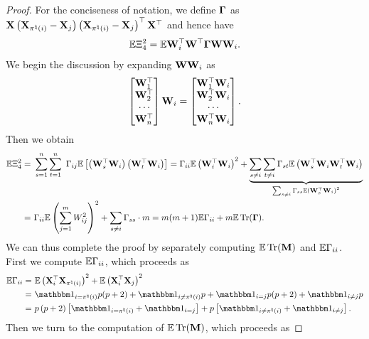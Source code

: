 \documentclass[11pt]{article}
\begin{document}
\begin{proof}
For the conciseness of notation, we define
$\boldsymbol{\Gamma}$ as $\mathbf{X} \left(\mathbf{X}_{\pi^{\natural}(i)} - \mathbf{X}_j\right)
\left(\mathbf{X}_{\pi^{\natural}(i)} - \mathbf{X}_j\right)^{\top} \mathbf{X}^{\top}$ and
hence have
\[
\mathbb{E} \Xi_4^2 =
\mathbb{E} {\mathbf{W}_i^{\top} \mathbf{W}^{\top} \boldsymbol{\Gamma}\mathbf{W}\mathbf{W}_i}.
\]
We begin the discussion by expanding $\mathbf{W} \mathbf{W}_i$ as
\[
\begin{bmatrix}
\mathbf{W}_1^{\top} \\
\mathbf{W}_2^{\top} \\
\cdots \\
\mathbf{W}_n^{\top}
\end{bmatrix}\mathbf{W}_i =
\begin{bmatrix}
\mathbf{W}_1^{\top}\mathbf{W}_i \\
\mathbf{W}_2^{\top}\mathbf{W}_i \\
\cdots \\
\mathbf{W}_n^{\top}\mathbf{W}_i	
\end{bmatrix}.
\]
Then we obtain
\begin{align}
\mathbb{E} \Xi_4^2 =~&
\sum_{s = 1}^n \sum_{t=1}^n \
\Gamma_{ij} \mathbb{E}\left[\left(\mathbf{W}_s^{\top}\mathbf{W}_i\right) \left(\mathbf{W}_t^{\top}\mathbf{W}_i\right)\right] =  \Gamma_{ii}\mathbb{E} \left(\mathbf{W}_i^{\top}\mathbf{W}_i\right)^2
+ \underbrace{\sum_{s \neq i} \sum_{t\neq i} \Gamma_{st} \mathbb{E}
\left(\mathbf{W}_s^{\top}\mathbf{W}_i \mathbf{W}_t^{\top}\mathbf{W}_i\right)}_{\sum_{s\neq i}
\Gamma_{ss}\mathbb{E}\left(\mathbf{W}_s^{\top}\mathbf{W}_i\right)^2} \notag \\
=~&\Gamma_{ii}\mathbb{E}\left(\sum_{j=1}^m W_{ij}^2\right)^2 +
\sum_{s\neq i} \Gamma_{ss} \cdot m =
m(m+1)\mathbb{E} \Gamma_{ii} + m\mathbb{E} \operatorname{Tr}(\boldsymbol{\Gamma}).
\label{eq:xifour_square_summary}
\end{align}
We can thus complete the proof by separately computing
$\mathbb{E}\operatorname{Tr}(\mathbf{M})$ and $\mathbb{E}\Gamma_{ii}$.
First we compute $\mathbb{E}\Gamma_{ii}$, which proceeds as
\begin{align}
\Expc \Gamma_{ii} = ~&
\Expc\bracket{\bX_i^{\rmt}\bX_{\pi^{\natural}(i)}}^2
+ \Expc \bracket{\bX_i^{\rmt}\bX_j}^2 \notag \\
=~&
\Ind_{i = \pi^{\natural}(i)} p(p+2) + \Ind_{i \neq  \pi^{\natural}(i)} p
+ \Ind_{i = j}p(p+2) + \Ind_{i \neq j} p \notag \\
=~& p\bracket{p+2}\Bracket{\Ind_{i = \pi^{\natural}(i)} + \Ind_{i = j}}
+ p\Bracket{\Ind_{i \neq \pi^{\natural}(i)} + \Ind_{i \neq j}}.
\label{eq:xifour_square_diag}
\end{align}
Then we turn to the computation of $\mathbb{E}\operatorname{Tr}(\mathbf{M})$, which proceeds as

\end{proof}
\end{document}
